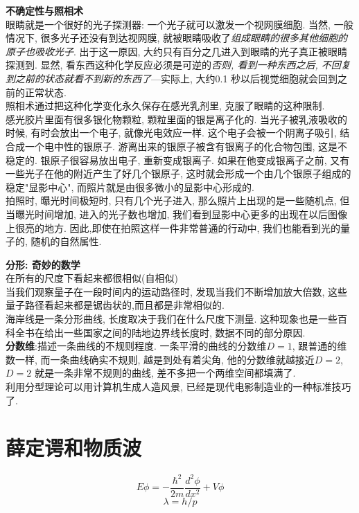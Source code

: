 \documentclass[openany]{book}
\begin{document}
\textbf{不确定性与照相术}\\
眼睛就是一个很好的光子探测器: 一个光子就可以激发一个视网膜细胞. 当然, 一般情况下, 很多光子还没有到达视网膜, 就被眼睛吸收了\textit{组成眼睛的很多其他细胞的原子也吸收光子}.
出于这一原因, 大约只有百分之几进入到眼睛的光子真正被眼睛探测到. 显然, 看东西这种化学反应必须是可逆的\textit{否则, 看到一种东西之后, 不回复到之前的状态就看不到新的东西了}---实际上, 大约0.1 秒以后视觉细胞就会回到之前的正常状态. \\
照相术通过把这种化学变化永久保存在感光乳剂里, 克服了眼睛的这种限制.\\
感光胶片里面有很多银化物颗粒, 颗粒里面的银是离子化的. 当光子被乳液吸收的时候, 有时会放出一个电子, 就像光电效应一样. 这个电子会被一个阴离子吸引, 结合成一个电中性的银原子.
游离出来的银原子被含有银离子的化合物包围, 这是不稳定的. 银原子很容易放出电子, 重新变成银离子. 如果在他变成银离子之前, 又有一些光子在他的附近产生了好几个银原子, 这时就会形成一个由几个银原子组成的稳定"显影中心", 而照片就是由很多微小的显影中心形成的.\\
拍照时, 曝光时间极短时, 只有几个光子进入, 那么照片上出现的是一些随机点, 但当曝光时间增加, 进入的光子数也增加, 我们看到显影中心更多的出现在以后图像上很亮的地方. 因此,即使在拍照这样一件非常普通的行动中, 我们也能看到光的量子的, 随机的自然属性.
\bigskip

\textbf{分形: 奇妙的数学}\\
在所有的尺度下看起来都很相似(自相似)\\
当我们观察量子在一段时间内的运动路径时, 发现当我们不断增加放大倍数, 这些量子路径看起来都是锯齿状的,而且都是非常相似的.\\
海岸线是一条分形曲线, 长度取决于我们在什么尺度下测量. 这种现象也是一些百科全书在给出一些国家之间的陆地边界线长度时, 数据不同的部分原因.\\
\textbf{分数维}:描述一条曲线的不规则程度. 一条平滑的曲线的分数维$D=1$, 跟普通的维数一样, 而一条曲线确实不规则, 越是到处有着尖角, 他的分数维就越接近$D=2$, $D=2$ 就是一条非常不规则的曲线, 差不多把一个两维空间都填满了.\\
利用分型理论可以用计算机生成人造风景, 已经是现代电影制造业的一种标准技巧了.

\section{薛定谔和物质波}
$$
E\phi = -\dfrac{\hbar^2}{2m} \frac{d^2 \phi}{dx^2} + V\phi
$$
$$
\lambda = h/p
$$
\end{document}
